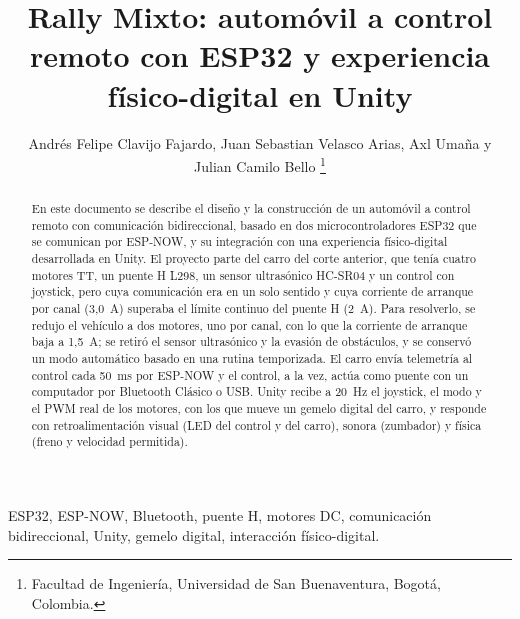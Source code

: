 \documentclass[journal]{IEEEtran}
\begin{document}
\title{Rally Mixto: automóvil a control remoto con ESP32 y experiencia físico-digital en Unity}

\author{Andrés Felipe Clavijo Fajardo, Juan Sebastian Velasco Arias, Axl Umaña y Julian Camilo Bello
\thanks{Facultad de Ingeniería, Universidad de San Buenaventura, Bogotá, Colombia.}}


\maketitle

\begin{abstract}
En este documento se describe el diseño y la construcción de un automóvil a control remoto con comunicación bidireccional, basado en dos microcontroladores ESP32 que se comunican por ESP-NOW, y su integración con una experiencia físico-digital desarrollada en Unity. El proyecto parte del carro del corte anterior, que tenía cuatro motores TT, un puente H L298, un sensor ultrasónico HC-SR04 y un control con joystick, pero cuya comunicación era en un solo sentido y cuya corriente de arranque por canal (3,0~A) superaba el límite continuo del puente H (2~A). Para resolverlo, se redujo el vehículo a dos motores, uno por canal, con lo que la corriente de arranque baja a 1,5~A; se retiró el sensor ultrasónico y la evasión de obstáculos, y se conservó un modo automático basado en una rutina temporizada. El carro envía telemetría al control cada 50~ms por ESP-NOW y el control, a la vez, actúa como puente con un computador por Bluetooth Clásico o USB. Unity recibe a 20~Hz el joystick, el modo y el PWM real de los motores, con los que mueve un gemelo digital del carro, y responde con retroalimentación visual (LED del control y del carro), sonora (zumbador) y física (freno y velocidad permitida).
\end{abstract}

\begin{IEEEkeywords}
ESP32, ESP-NOW, Bluetooth, puente H, motores DC, comunicación bidireccional, Unity, gemelo digital, interacción físico-digital.
\end{IEEEkeywords}
\end{document}

